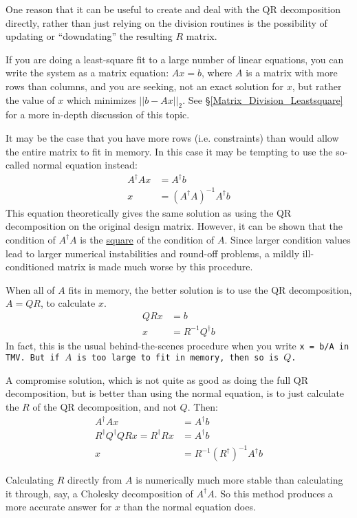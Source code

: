 One reason that it can be useful to create and deal with the QR decomposition directly,
rather than 
just relying on the division routines is the possibility
of updating or ``downdating'' the resulting $R$ matrix.  

If you are doing a 
least-square fit to a large number of linear equations, you can write the system as
a matrix equation: 
$A x = b$, where $A$ is a matrix with more rows than columns, and you are seeking,
not an exact solution for $x$, but rather the value of $x$ which minimizes
$||b-Ax||_2$.  See \S\ref{Matrix_Division_Leastsquare} for a more in-depth discussion of this topic.

It may be the case that you
have more rows (i.e. constraints) than would allow the entire matrix to fit in memory.  
In this case it may be tempting to use the so-called normal equation instead: 
\begin{align*}
A^\dagger A x &= A^\dagger b \\
x & = (A^\dagger A)^{-1} A^\dagger b
\end{align*}
This equation theoretically gives the same 
solution as using the QR decomposition on the original design matrix.
However, it can be shown that the condition of $A^\dagger A$ is the 
\underline{square} of the condition of $A$.  Since larger condition values
lead to larger numerical instabilities and round-off problems, a mildly
ill-conditioned matrix is made much worse by this procedure.

When all of $A$ fits in memory, the better solution is to use the QR decomposition, $A = QR$,
to calculate $x$.
\begin{align*}
Q R x &= b \\
x &= R^{-1} Q^\dagger b
\end{align*}
In fact, this is the usual behind-the-scenes procedure when you write \tt{x = b/A} in TMV.
But if $A$ is too large to fit in memory, then so is $Q$.

A compromise solution, which is not quite as good as doing the full QR decomposition,
but is better than using the normal equation, is to just calculate the $R$ of the
QR decomposition, and not $Q$.  Then:
\begin{align*}
A^\dagger A x &= A^\dagger b \\
R^\dagger Q^\dagger Q R x = R^\dagger R x &= A^\dagger b \\
x &= R^{-1} (R^\dagger)^{-1} A^\dagger b
\end{align*}

Calculating $R$ directly from $A$ is numerically much more stable than 
calculating it through, say, a Cholesky decomposition of $A^\dagger A$.
So this method produces a more accurate answer for $x$ than the normal equation does.

